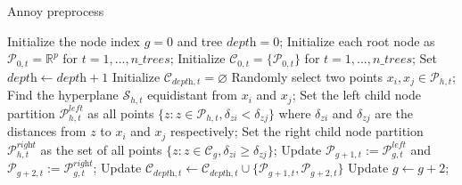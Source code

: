 \documentclass[11pt,a4paper,]{article}
\begin{document}
\begin{algorithm}[!b]
  \caption{Annoy preprocess}
  \label{alg:annoypre}
  \begin{algorithmic}[1]
    \STATE Initialize the node index $g=0$ and tree $\textit{depth}=0$;
    \STATE Initialize each root node as $\mathcal{P}_{0,t}=\mathbb{R}^p$ for $t=1,\dots,\textit{n\_trees}$;
    \STATE Initialize $\mathcal{C}_{0,t}=\{\mathcal{P}_{0,t}\}$ for $t=1,\dots,\textit{n\_trees}$;
        \STATE Set $\textit{depth}\leftarrow \textit{depth}+1$
        \STATE Initialize $\mathcal{C}_{\textit{depth},t}=\varnothing$
        \STATE Randomly select two points $x_i,x_j\in\mathcal{P}_{h,t}$;
        \STATE Find the hyperplane $\mathcal{S}_{h,t}$ equidistant from $x_i$ and $x_j$;
        \STATE Set the left child node partition $\mathcal{P}^{\textit{left}}_{h,t}$ as all points $\{z:z\in\mathcal{P}_{h,t},\delta_{zi}<\delta_{zj}\}$ where $\delta_{zi}$ and $\delta_{zj}$ are the distances from $z$ to $x_i$ and $x_j$ respectively;
        \STATE Set the right child node partition $\mathcal{P}^{\textit{right}}_{h,t}$ as the set of all points $\{z:z\in\mathcal{C}_g,\delta_{zi}\geq \delta_{zj}\}$;
        \STATE Update $\mathcal{P}_{g+1,t}:=\mathcal{P}_{g,t}^{\textit{left}}$ and $\mathcal{P}_{g+2,t}:=\mathcal{P}_{g,t}^{\textit{right}}$;
        \STATE Update $\mathcal{C}_{\textit{depth},t}\leftarrow\mathcal{C}_{\textit{depth},t}\cup\{\mathcal{P}_{g+1,t},\mathcal{P}_{g+2,t}\}$
        \STATE Update $g\leftarrow g+2$;
        \ENDFOR
      \ENDWHILE
    \ENDFOR
  \end{algorithmic}
\end{algorithm}
\end{document}
